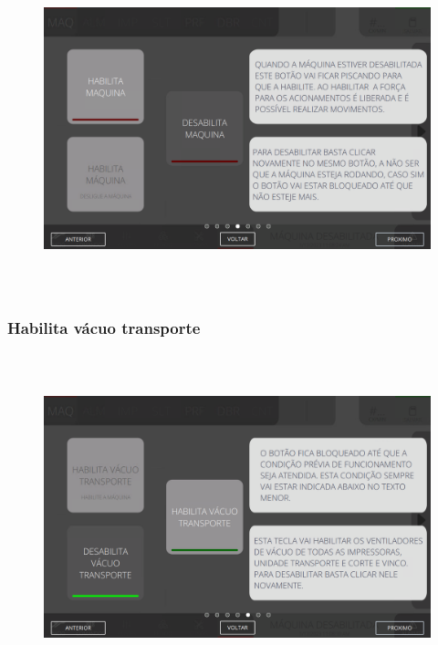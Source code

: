 \begin{figure}[h]
  \centering
  \includegraphics[width=576px,height=360px]{src/imagesFlexo/02-machine/e-4.png}
\end{figure}

\vspace*{\fill}

\newpage
\thispagestyle{fancy}

\vspace*{40 pt}

\subsubsection{\small{Habilita vácuo transporte}}\label{telaComandosMaquinaHabilitaVacioTransporte}

\vspace*{\fill}

\begin{figure}[h]
  \centering
  \includegraphics[width=576px,height=360px]{src/imagesFlexo/02-machine/e-5.png}
\end{figure}

